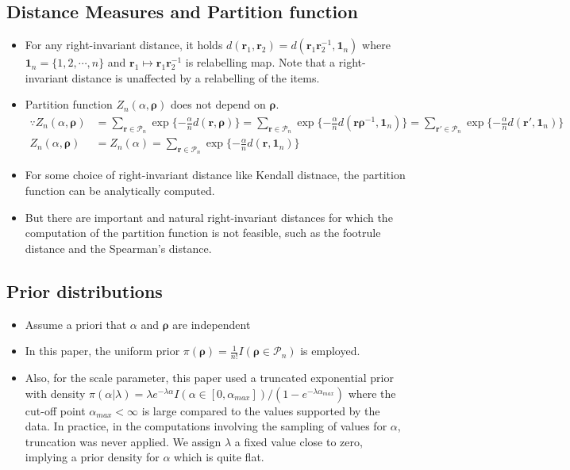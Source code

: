 \documentclass[12pt]{article}
\begin{document}
\subsection{Distance Measures and Partition function}
\begin{itemize}
    \item For any right-invariant distance, it holds $d(\mathbf{r}_1, \mathbf{r}_2)=d(\mathbf{r}_1 \mathbf{r}_2^{-1}, \mathbf{1}_n)$ where $\mathbf{1}_n=\{1,2,\cdots,n\}$ and $\mathbf{r}_1 \mapsto \mathbf{r}_1 \mathbf{r}_2^{-1}$ is relabelling map. Note that a right-invariant distance is unaffected by a relabelling of the items.
    \item Partition function $Z_n(\alpha, \boldsymbol{\rho})$ does not depend on $\boldsymbol{{\rho}}$. 
    \begin{align*}
    \because Z_n(\alpha, \boldsymbol{\rho}) &= \sum_{\mathbf{r}\in \mathcal{P}_n}\exp\{-\frac{\alpha}{n}d(\mathbf{r},\boldsymbol{\rho})\} = \sum_{\mathbf{r}\in \mathcal{P}_n}\exp\{-\frac{\alpha}{n}d(\mathbf{r} \boldsymbol{\rho}^{-1}, \mathbf{1}_n)\}=\sum_{\mathbf{r'}\in \mathcal{P}_n}\exp\{-\frac{\alpha}{n}d(\mathbf{r'},\mathbf{1}_n)\} \\ Z_n(\alpha, \boldsymbol{\rho}) &= Z_n(\alpha)=\sum_{\mathbf{r}\in \mathcal{P}_n}\exp\{-\frac{\alpha}{n}d(\mathbf{r},\mathbf{1}_n)\}
    \end{align*}
    \item For some choice of right-invariant distance like Kendall distnace, the partition function can be analytically computed. 
    \item But there are important and natural right-invariant distances for which the computation of the partition function is not feasible, such as the footrule distance and the Spearman's distance.
\end{itemize}
\subsection{Prior distributions}
\begin{itemize}
    \item Assume a priori that $\alpha$ and $\boldsymbol{\rho}$ are independent
    \item In this paper, the uniform prior $\pi(\boldsymbol{\rho})=\frac{1}{n!}I(\boldsymbol{\rho}\in \mathcal{P}_n)$ is employed.
    \item Also, for the scale parameter, this paper used a truncated exponential prior with density $\pi(\alpha | \lambda)=\lambda e^{-\lambda \alpha}I(\alpha\in [0, \alpha_{max}])/(1-e^{-\lambda \alpha_{max}})$ where the cut-off point $\alpha_{max}<\infty$ is large compared to the values supported by the data. In practice, in the computations involving the sampling of values for $\alpha$, truncation was never applied. We assign $\lambda$ a fixed value close to zero, implying a prior density for $\alpha$ which is quite flat.
\end{itemize}
\end{document}
